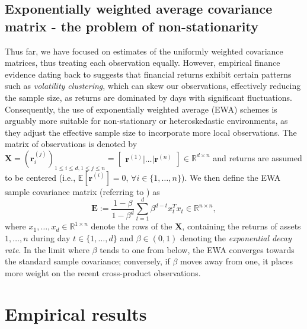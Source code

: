 \documentclass[sigconf]{acmart}
\begin{document}
\subsection{Exponentially weighted average covariance matrix - the problem of non-stationarity}

Thus far, we have focused on estimates of the uniformly weighted covariance matrices, thus treating each observation equally. However,  empirical finance evidence dating back to \cite{Mandelbrot} suggests that financial returns exhibit certain patterns such as \textit{volatility clustering}, which can skew our observations, effectively reducing the sample size, as returns are dominated by days with significant fluctuations. Consequently, the use of exponentially weighted average (EWA) schemes is arguably more suitable for non-stationary or heteroskedastic environments, as they adjust the effective sample size to incorporate more local observations. The matrix of observations is denoted by $\bm{X} = (\mathbf{r}^{(j)}_i)_{1 \leq i \leq d, 1 \leq j \leq n} = \begin{bmatrix} \mathbf{r}^{(1)} | \hdots |\mathbf{r}^{(n)}\end{bmatrix} \in \mathbb{R}^{d \times n}$ and returns are assumed to be centered (i.e., $\mathbb{E}[\mathbf{r}^{(i)}] = 0$, $\forall i \in \{1, \hdots, n\}$). We then define the EWA sample covariance matrix (referring to \cite{TanZohren}) as 
\begin{equation*}
\bm{E} := \frac{1 - \beta}{1 - \beta^d} \sum_{t=1}^{d} \beta^{d-t} x_t^T x_t \in \mathbb{R}^{n \times n}, 
\end{equation*}
where $x_1, \hdots, x_d \in \mathbb{R}^{1\times n}$ denote the rows of the $\bm{X}$, containing the returns of assets $1, \hdots, n$ during day $t \in \{1, \hdots, d\}$ and  $\beta \in (0, 1)$ denoting the \textit{exponential decay rate}. In the limit where $\beta$ tends to one from below, the EWA converges towards the standard sample covariance; conversely, if $\beta$ moves away from one, it places more weight on the recent cross-product observations.


\section{Empirical results}
\label{empirical}
\end{document}
